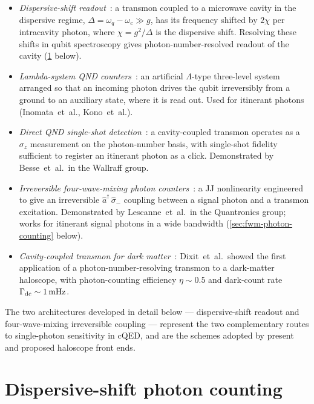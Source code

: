\begin{itemize}
  \item \emph{Dispersive-shift readout}~\cite{schuster2007}: a
        transmon coupled to a microwave cavity in the dispersive
        regime, $\Delta=\omega_q-\omega_c\gg g$, has its
        frequency shifted by $2\chi$ per intracavity photon, where
        $\chi=g^2/\Delta$ is the dispersive shift. Resolving
        these shifts in qubit spectroscopy gives photon-number-resolved
        readout of the cavity (\cref{sec:disp-photon-counting}
        below).
  \item \emph{Lambda-system QND counters}~\cite{inomata2016,kono2018}:
        an artificial $\Lambda$-type three-level system arranged
        so that an incoming photon drives the qubit irreversibly
        from a ground to an auxiliary state, where it is read out.
        Used for itinerant photons (Inomata~et~al., Kono~et~al.).
  \item \emph{Direct QND single-shot detection}~\cite{besse2018}:
        a cavity-coupled transmon operates as a $\sigma_z$
        measurement on the photon-number basis, with single-shot
        fidelity sufficient to register an itinerant photon as a
        click. Demonstrated by Besse~et~al.\ in the Wallraff group.
  \item \emph{Irreversible four-wave-mixing photon counters}~\cite{lescanne2020}:
        a JJ nonlinearity engineered to give an irreversible
        $\hat a^\dagger\,\hat\sigma_-$ coupling between a signal
        photon and a transmon excitation. Demonstrated by
        Lescanne~et~al.\ in the Quantronics group; works for
        itinerant signal photons in a wide bandwidth
        (\cref{sec:fwm-photon-counting} below).
  \item \emph{Cavity-coupled transmon for dark matter}~\cite{dixit2021}:
        Dixit~et~al.\ showed the first application of a
        photon-number-resolving transmon to a dark-matter haloscope,
        with photon-counting efficiency $\eta\sim 0.5$ and
        dark-count rate $\Gamma_{\rm dc}\sim 1\,\text{mHz}$.
\end{itemize}

The two architectures developed in detail below ---
dispersive-shift readout and four-wave-mixing irreversible
coupling --- represent the two complementary routes to
single-photon sensitivity in cQED, and are the schemes adopted by
present and proposed haloscope front ends.

\section{Dispersive-shift photon counting}
\label{sec:disp-photon-counting}

